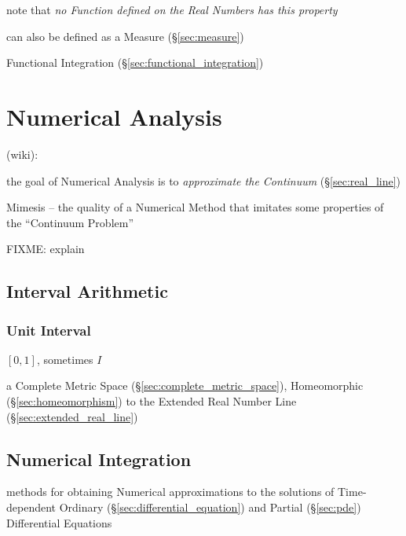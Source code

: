 note that \emph{no Function defined on the Real Numbers has this property}

can also be defined as a Measure (\S\ref{sec:measure})

\fist Functional Integration (\S\ref{sec:functional_integration})



\section{Numerical Analysis}\label{sec:numerical_analysis}

(wiki):

the goal of Numerical Analysis is to \emph{approximate the Continuum}
(\S\ref{sec:real_line})

Mimesis -- the quality of a Numerical Method that imitates some properties of
the ``Continuum Problem''

FIXME: explain



\subsection{Interval Arithmetic}\label{sec:interval_arithmetic}

\subsubsection{Unit Interval}\label{sec:unit_interval}

$[0,1]$, sometimes $I$

a Complete Metric Space (\S\ref{sec:complete_metric_space}),
Homeomorphic (\S\ref{sec:homeomorphism}) to the Extended Real Number
Line (\S\ref{sec:extended_real_line})



\subsection{Numerical Integration}\label{sec:numerical_integration}

methods for obtaining Numerical approximations to the solutions of
Time-dependent Ordinary (\S\ref{sec:differential_equation}) and Partial
(\S\ref{sec:pde}) Differential Equations

